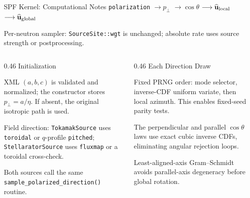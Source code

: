 \documentclass[aspectratio=169,10pt]{beamer}
\newcommand{\slideline}{\par\vspace{0.12cm}{\color{jqdark}\rule{\linewidth}{0.65pt}}\par}
\begin{document}
\begin{frame}{SPF Kernel: Computational Notes}
  \centering
  {\fontsize{8.8}{10.6}\selectfont
  \texttt{polarization} $\longrightarrow p_\perp$ $\longrightarrow \cos\theta$ $\longrightarrow \widehat{\mathbf u}_{\rm local}$ $\longrightarrow \widehat{\mathbf u}_{\rm global}$}

  \vspace{0.02cm}
  {\fontsize{8.4}{10.0}\selectfont Per-neutron sampler: \texttt{SourceSite::wgt} is unchanged; absolute rate uses source strength or postprocessing.}

  \vspace{0.05cm}
  \begin{columns}[T,onlytextwidth]
    \begin{column}{0.46\textwidth}
      Initialization
      \slideline
      {\fontsize{8.6}{10.3}\selectfont
      XML $(a,b,c)$ is validated and normalized; the constructor stores $p_\perp=a/\eta$. If absent, the original isotropic path is used.

      \vspace{0.10cm}
      Field direction: \texttt{TokamakSource} uses \texttt{toroidal} or $q$-profile \texttt{pitched}; \texttt{StellaratorSource} uses \texttt{fluxmap} or a toroidal cross-check.

      \vspace{0.10cm}
      Both sources call the same \texttt{sample\_polarized\_direction()} routine.
      }
    \end{column}
    \begin{column}{0.46\textwidth}
      Each Direction Draw
      \slideline
      {\fontsize{8.6}{10.3}\selectfont
      Fixed PRNG order: mode selector, inverse-CDF uniform variate, then local azimuth. This enables fixed-seed parity tests.

      \vspace{0.10cm}
      The perpendicular and parallel $\cos\theta$ laws use exact cubic inverse CDFs, eliminating angular rejection loops.

      \vspace{0.10cm}
      Least-aligned-axis Gram--Schmidt avoids parallel-axis degeneracy before global rotation.
      }
    \end{column}
  \end{columns}


\end{frame}
\end{document}
